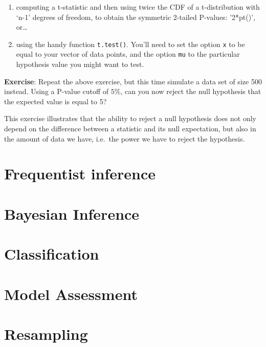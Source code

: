 \documentclass[
]{book}
\begin{document}
\begin{enumerate}
\def\labelenumi{\arabic{enumi}.}
\item
  computing a t-statistic and then using twice the CDF of a t-distribution with `n-1' degrees of freedom, to obtain the symmetric 2-tailed P-values: '2*pt()', or\ldots{}
\item
  using the handy function \texttt{t.test()}. You'll need to set the option \texttt{x} to be equal to your vector of data points, and the option \texttt{mu} to the particular hypothesis value you might want to test.
\end{enumerate}

\textbf{Exercise}: Repeat the above exercise, but this time simulate a data set of size 500 instead. Using a P-value cutoff of \(5\%\), can you now reject the null hypothesis that the expected value is equal to 5?

This exercise illustrates that the ability to reject a null hypothesis does not only depend on the difference between a statistic and its null expectation, but also in the amount of data we have, i.e.~the power we have to reject the hypothesis.

\hypertarget{frequentist-inference}{%
\chapter{Frequentist inference}\label{frequentist-inference}}

\hypertarget{bayesian-inference}{%
\chapter{Bayesian Inference}\label{bayesian-inference}}

\hypertarget{classification}{%
\chapter{Classification}\label{classification}}

\hypertarget{model-assessment}{%
\chapter{Model Assessment}\label{model-assessment}}

\hypertarget{resampling}{%
\chapter{Resampling}\label{resampling}}
\end{document}

